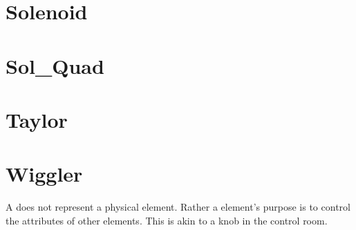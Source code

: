 \section{Solenoid}
\label{s:sol}

\section{Sol\_Quad}
\label{s:sq}

\section{Taylor}
\label{s:tay}

\section{Wiggler} 
\label{s:wig}

A  does not represent a physical element. Rather a
 element's purpose is to control the attributes of other elements.
This is akin to a knob in the control room.